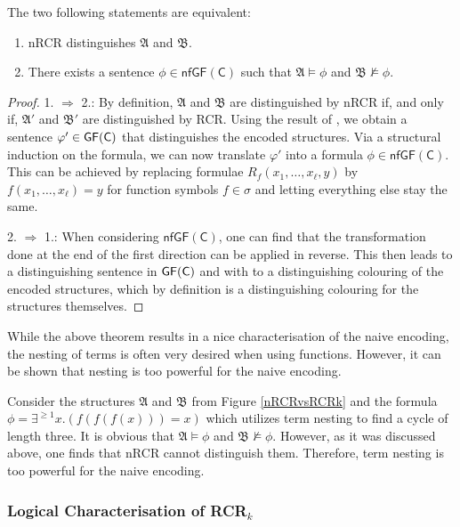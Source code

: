 \begin{theorem}
	\label{thm:ThmA}
	The two following statements are equivalent:
	\begin{enumerate}
		\item nRCR distinguishes $\mathfrak A$ and $\mathfrak B$.
		\item There exists a sentence $\phi\in \mathsf{nfGF}(\mathsf C)$ such that $\mathfrak A\models \phi$ and $\mathfrak B\not\models \phi$.
	\end{enumerate}
\end{theorem}
\begin{proof}
	1. $\Rightarrow$ 2.:
	By definition, $\mathfrak A$ and $\mathfrak B$ are distinguished by nRCR if, and only if, $\mathfrak A'$ and $\mathfrak B'$ are distinguished by RCR.
	Using the result of \cite{scheidt2025ColorRefinement}, we obtain a sentence $\varphi'\in\mathsf{GF}(\mathsf{C})$ that distinguishes the encoded structures.
	Via a structural induction on the formula, we can now translate $\varphi'$ into a formula $\phi\in \mathsf{nfGF}(\mathsf C)$.
	This can be achieved by replacing formulae $R_f(x_1,\dots,x_\ell,y)$ by $f(x_1,\dots,x_\ell)=y$ for function symbols $f\in\sigma$ and letting everything else stay the same.
	
	2. $\Rightarrow$ 1.:
	When considering $\mathsf{nfGF}(\mathsf C)$, one can find that the transformation done at the end of the first direction can be applied in reverse.
	This then leads to a distinguishing sentence in $\mathsf{GF}(\mathsf{C})$ and with \cite{scheidt2025ColorRefinement} to a distinguishing colouring of the encoded structures, which by definition is a distinguishing colouring for the structures themselves.
\end{proof}

While the above theorem results in a nice characterisation of the naive encoding, the nesting of terms is often very desired when using functions.
However, it can be shown that nesting is too powerful for the naive encoding.

Consider the structures $\mathfrak A$ and $\mathfrak B$ from Figure \ref{nRCRvsRCRk} and the formula $\phi=\exists^{\geq 1} x.(f(f(f(x)))=x)$ which utilizes term nesting to find a cycle of length three.
It is obvious that $\mathfrak A \models \phi$ and $\mathfrak B\not\models \phi$.
However, as it was discussed above, one finds that nRCR cannot distinguish them.
Therefore, term nesting is too powerful for the naive encoding.


\subsubsection{Logical Characterisation of RCR$_k$}

